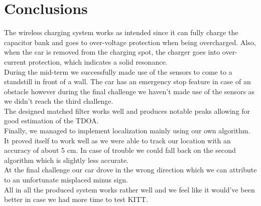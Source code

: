 \documentclass[final]{scrreprt} %
\begin{document}
\chapter{Conclusions}

The wireless charging system works as intended since it can fully charge the capacitor bank and goes to over-voltage protection when being overcharged.
Also, when the car is removed from the charging spot, the charger goes into over-current protection, which indicates a solid resonance.\\
During the mid-term we successfully made use of the sensors to come to a standstill in front of a wall.
The car has an emergency stop feature in case of an obstacle however during the final challenge we haven't made use of the sensors as we didn't reach the third challenge.\\
The designed matched filter works well and produces notable peaks allowing for good estimation of the TDOA.\\
Finally, we managed to implement localization mainly using our own algorithm.
It proved itself to work well as we were able to track our location with an accuracy of about 5 cm.
In case of trouble we could fall back on the second algorithm which is slightly less accurate.\\
At the final challenge our car drove in the wrong direction which we can attribute to an unfortunate misplaced minus sign.\\
All in all the produced system works rather well and we feel like it would've been better in case we had more time to test KITT.
\end{document}
